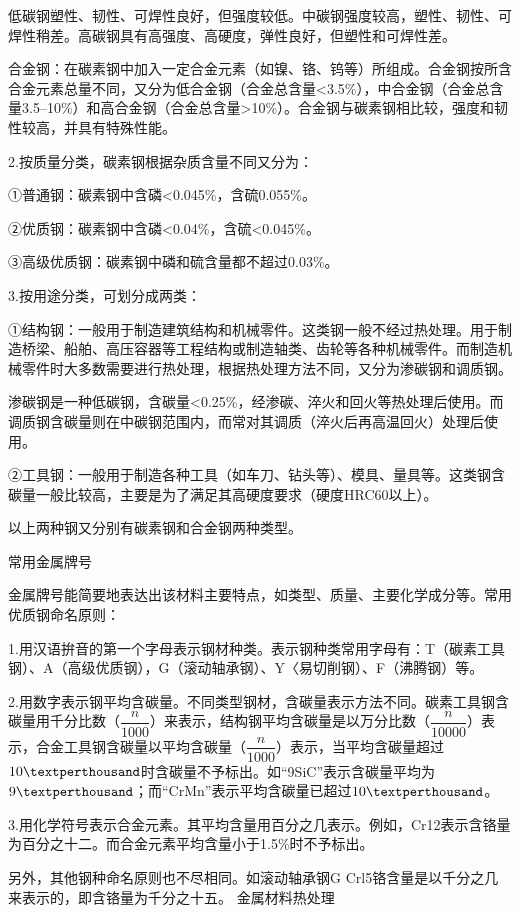 \documentclass{ctexbook}
\begin{document}
低碳钢塑性、韧性、可焊性良好，但强度较低。中碳钢强度较高，塑性、韧性、可焊性稍差。高碳钢具有高强度、高硬度，弹性良好，但塑性和可焊性差。

合金钢：在碳素钢中加入一定合金元素（如镍、铬、钨等）所组成。合金钢按所含合金元素总量不同，又分为低合金钢（合金总含量<3.5\%），中合金钢（合金总含量3.5--10\%）和高合金钢（合金总含量>10\%）。合金钢与碳素钢相比较，强度和韧性较高，并具有特殊性能。

2.按质量分类，碳素钢根据杂质含量不同又分为：

①普通钢：碳素钢中含磷<0.045\%，含硫0.055\%。

②优质钢：碳素钢中含磷<0.04\%，含硫<0.045\%。

③高级优质钢：碳素钢中磷和硫含量都不超过0.03\%。

3.按用途分类，可划分成两类：

①结构钢：一般用于制造建筑结构和机械零件。这类钢一般不经过热处理。用于制造桥梁、船舶、高压容器等工程结构或制造轴类、齿轮等各种机械零件。而制造机械零件时大多数需要进行热处理，根据热处理方法不同，又分为渗碳钢和调质钢。

渗碳钢是一种低碳钢，含碳量<0.25\%，经渗碳、淬火和回火等热处理后使用。而调质钢含碳量则在中碳钢范围内，而常对其调质（淬火后再高温回火）处理后使用。

②工具钢：一般用于制造各种工具（如车刀、钻头等）、模具、量具等。这类钢含碳量一般比较高，主要是为了满足其高硬度要求（硬度HRC60以上）。

以上两种钢又分别有碳素钢和合金钢两种类型。

常用金属牌号

金属牌号能简要地表达出该材料主要特点，如类型、质量、主要化学成分等。常用优质钢命名原则：

1.用汉语拚音的第一个字母表示钢材种类。表示钢种类常用字母有：T（碳素工具钢）、A（高级优质钢），G（滚动轴承钢）、Y〈易切削钢）、F（沸腾钢）等。

2.用数字表示钢平均含碳量。不同类型钢材，含碳量表示方法不同。碳素工具钢含碳量用千分比数（$\dfrac{n}{1000}$）来表示，结构钢平均含碳量是以万分比数（$\dfrac{n}{10000}$）表示，合金工具钢含碳量以平均含碳量（$\dfrac{n}{1000}$）表示，当平均含碳量超过$10 \textperthousand $时含碳量不予标出。如“9SiC”表示含碳量平均为$ 9 \textperthousand $；而“CrMn”表示平均含碳量已超过$ 10 \textperthousand $。

3.用化学符号表示合金元素。其平均含量用百分之几表示。例如，Cr12表示含铬量为百分之十二。而合金元素平均含量小于1.5\%时不予标出。

另外，其他钢种命名原则也不尽相同。如滚动轴承钢G Crl5铬含量是以千分之几来表示的，即含铬量为千分之十五。
金属材料热处理
\end{document}
